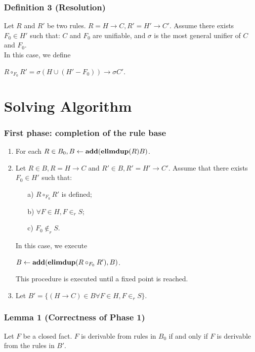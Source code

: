 \documentclass[10pt]{beamer}
\begin{document}
\begin{frame}
  \frametitle{Definition 3 (Resolution)}

  Let $R$ and $R'$ be two rules.
  $R = H \rightarrow C, R' = H' \rightarrow C'$.
  Assume there exists $F_0 \in H'$ such that: $C$ and $F_0$ are unifiable, and $\sigma$ is the most general unifier of $C$ and $F_0$.\\
  \mytab In this case, we define \\ \myvspace
  \begin{center}
    $R \circ_{F_0} R' = \sigma(H \cup (H' - F_0)) \rightarrow \sigma C'$.
  \end{center}
\end{frame}

\section{Solving Algorithm}

\begin{frame}
  \frametitle{First phase: completion of the rule base}

  \begin{enumerate}
    \item For each $R \in B_0, B \leftarrow \textbf{add}(\textbf{elimdup}(R)B)$.
    \item Let $R \in B, R = H \rightarrow C$ and $R' \in B, R' = H' \rightarrow C'$.
      Assume that there exists $F_0 \in H'$ such that:
      \begin{itemize}
        \item[a)] $R \circ_{F_0} R'$ is defined;
        \item[b)] $\forall F \in H, F \in_r S$;
        \item[c)] $F_0 \not\in_r S$.
      \end{itemize}
      In this case, we execute\\
      \begin{center}
        $B \leftarrow \textbf{add}(\textbf{elimdup}(R \circ_{F_0} R'), B)$.
      \end{center}
      This procedure is executed until a fixed point is reached.
    \item Let $B' = \{(H \rightarrow C) \in B \forall F \in H, F \in_r S\}$.
  \end{enumerate}
\end{frame}

\begin{frame}
  \frametitle{Lemma 1 (Correctness of Phase 1)}
  \centering

  \parbox{.7\textwidth}{
    Let $F$ be a closed fact.
    $F$ is derivable from rules in $B_0$ if and only if $F$ is derivable from the rules in $B'$.
  }
\end{frame}
\end{document}

